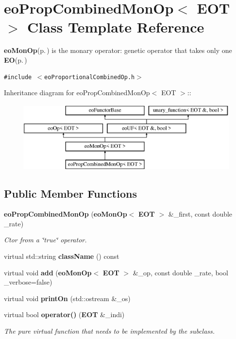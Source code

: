 \section{eo\-Prop\-Combined\-Mon\-Op$<$ EOT $>$ Class Template Reference}
\label{classeo_prop_combined_mon_op}
{\bf eo\-Mon\-Op}{\rm (p.\,\pageref{classeo_mon_op})} is the monary operator: genetic operator that takes only one {\bf EO}{\rm (p.\,\pageref{class_e_o})}  


{\tt \#include $<$eo\-Proportional\-Combined\-Op.h$>$}

Inheritance diagram for eo\-Prop\-Combined\-Mon\-Op$<$ EOT $>$::\begin{figure}[H]
\begin{center}
\leavevmode
\includegraphics[height=3.58974cm]{classeo_prop_combined_mon_op}
\end{center}
\end{figure}
\subsection*{Public Member Functions}
\begin{CompactItemize}
\item 
{\bf eo\-Prop\-Combined\-Mon\-Op} ({\bf eo\-Mon\-Op}$<$ {\bf EOT} $>$ \&\_\-first, const double \_\-rate)\label{classeo_prop_combined_mon_op_a0}

\begin{CompactList}\small\item\em Ctor from a \char`\"{}true\char`\"{} operator. \item\end{CompactList}\item 
virtual std::string {\bf class\-Name} () const \label{classeo_prop_combined_mon_op_a1}

\item 
virtual void {\bf add} ({\bf eo\-Mon\-Op}$<$ {\bf EOT} $>$ \&\_\-op, const double \_\-rate, bool \_\-verbose=false)\label{classeo_prop_combined_mon_op_a2}

\item 
virtual void {\bf print\-On} (std::ostream \&\_\-os)\label{classeo_prop_combined_mon_op_a3}

\item 
virtual bool {\bf operator()} ({\bf EOT} \&\_\-indi)\label{classeo_prop_combined_mon_op_a4}

\begin{CompactList}\small\item\em The pure virtual function that needs to be implemented by the subclass. \item\end{CompactList}\end{CompactItemize}
